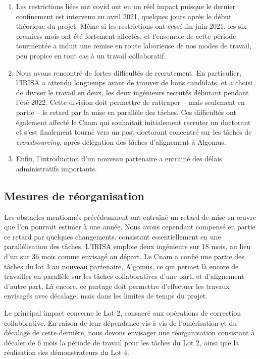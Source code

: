 \documentclass[11pt]{article}
\begin{document}
\begin{enumerate}
  \item Les restrictions liées ont covid ont eu un réel impact puisque le dernier confinement 
     est intervenu en avril 2021, quelques jours après le début théorique du projet. Même 
     si les restrictions ont cessé fin juin  2021, les six premiers mois ont été fortement
     affectés, et l'ensemble de cette période tourmentée a induit une remise en route laborieuse
     de nos modes de travail, peu propice en tout cas à un travail collaboratif.
    \item Nous avons rencontré de fortes difficultés de recrutement. En particulier, l'IRISA
     a attendu longtemps avant de trouver de bons candidats, et a choisi de diviser le travail
      en deux, les deux ingénieurs recrutés débutant pendant l'été 2022. Cette division doit permettre
      de rattraper -- mais seulement en partie -- le retard par la mise en parallèle des tâches. Ces difficultés
      ont également affecté le Cnam qui souhaitait initialement recruter un doctorant et s'est finalement
      tourné vers un post-doctorant concentré sur les tâches de \textit{crowdsourcing}, après
      délégation des tâches d'alignement à Algomus.
    \item Enfin, l'introduction d'un nouveau partenaire a entrainé des délais administratifs importants.    
\end{enumerate}


\subsection{Mesures de réorganisation}

Les obstacles mentionnés précédemment ont entraîné un
retard de mise en œuvre que l'on pourrait estimer à une année. Nous avons cependant compensé
en partie ce retard par quelques changements, consistant  essentiellement en une parallélisation
des tâches. L'IRISA emploie deux ingénieurs sur 18 mois, au lieu d'un sur 36 mois comme envisagé 
au départ. Le Cnam a confié une partie des tâches du lot 3 au nouveau partenaire, Algomus, 
ce qui permet là encore de travailler en parallèle sur les tâches collaboratives d'une part, et
d'alignement d'autre part.  Là encore, ce partage doit permettre d'effectuer les travaux envisagés
avec décalage, mais dans les limites de temps du projet.

Le principal impact concerne le Lot 2, consacré aux opérations de correction collaborative. En raison
de leur dépendance vis-à-vis de l'omérisation et du décalage de cette dernière, nous devons envisager 
une réorganisation consistant à décaler de 6 mois la période de travail pour les tâches du Lot 2,
ainsi que la réalisation des démonstrateurs du Lot 4.
\end{document}
